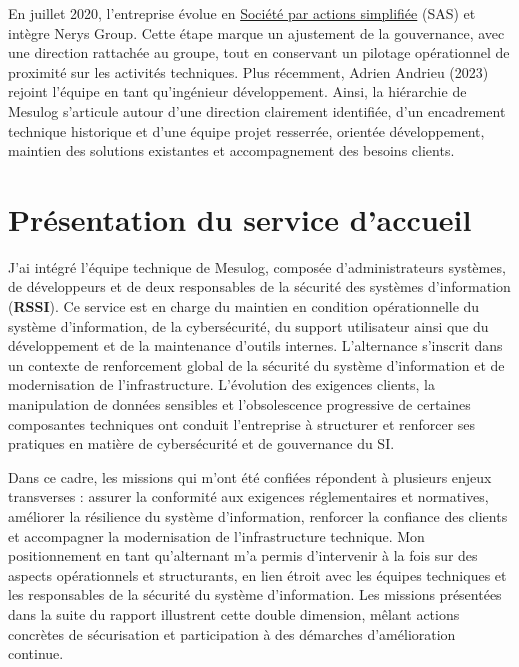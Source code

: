\documentclass[a4paper, 11pt]{article}
\begin{document}
\par\bigskip
 En juillet 2020, l'entreprise évolue en \href{https://fr.wikipedia.org/wiki/Société_par_actions_simplifiée}{Société par actions simplifiée} (SAS) et intègre Nerys Group. Cette étape marque un ajustement de la gouvernance, avec une direction 
 rattachée au groupe, tout en conservant un pilotage opérationnel de proximité sur les activités techniques.
Plus récemment, Adrien Andrieu (2023) rejoint l'équipe en tant qu'ingénieur développement. Ainsi, la hiérarchie de Mesulog s'articule autour d'une direction
 clairement identifiée, d'un encadrement technique historique et d'une équipe projet resserrée, orientée développement, maintien des solutions existantes et
  accompagnement des besoins clients.


\section{Présentation du service d'accueil}

J’ai intégré l’équipe technique de Mesulog, composée d’administrateurs systèmes, de développeurs et de deux responsables de la sécurité des systèmes d'information 
(\textbf{\gls{RSSI}}). Ce service est en charge du maintien en condition opérationnelle du système d’information, de la cybersécurité, du support utilisateur ainsi 
que du développement et de la maintenance d’outils internes. L’alternance s’inscrit dans un contexte de renforcement global de la sécurité du système d’information et 
de modernisation de l’infrastructure. L’évolution des exigences clients, la manipulation de données sensibles et l’obsolescence progressive de certaines composantes 
techniques ont conduit l’entreprise à structurer et renforcer ses pratiques en matière de cybersécurité et de gouvernance du SI.
\par\bigskip
Dans ce cadre, les missions qui m’ont été confiées répondent à plusieurs enjeux transverses : assurer la conformité aux exigences réglementaires et normatives, améliorer la résilience du système 
 d’information, renforcer la confiance des clients et accompagner la modernisation de l’infrastructure technique. Mon positionnement en tant qu’alternant m’a 
 permis d’intervenir à la fois sur des aspects opérationnels et structurants, en lien étroit avec les équipes techniques et les responsables de la sécurité du système
  d’information. Les missions présentées dans la suite du rapport illustrent cette double dimension, mêlant actions concrètes de sécurisation et participation à des 
  démarches d’amélioration continue.
\end{document}
